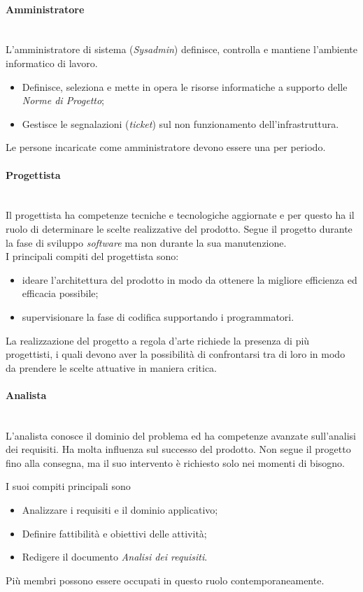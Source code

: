 \documentclass[10pt, letterpaper]{article}
\newcommand{\trisubsection}[1]{\paragraph{#1}\mbox{}\\}
\begin{document}
\label{sec:Amministratore}
\trisubsection{Amministratore}
L'amministratore di sistema (\textit{Sysadmin}) definisce, controlla e mantiene l'ambiente informatico di lavoro.
\begin{itemize}
    \item Definisce, seleziona e mette in opera le risorse informatiche a supporto delle \textit{Norme di Progetto};
    \item Gestisce le segnalazioni (\textit{ticket}) sul non funzionamento dell'infrastruttura.
\end{itemize}
Le persone incaricate come amministratore devono essere una per periodo.

\label{sec:Progettista}
\trisubsection{Progettista}
Il progettista ha competenze tecniche e tecnologiche aggiornate e per questo ha il ruolo di determinare le scelte realizzative del prodotto. Segue il progetto durante la fase di sviluppo \textit{software} ma non durante la sua manutenzione. \\

I principali compiti del progettista sono:
\begin{itemize}
    \item ideare l'architettura del prodotto in modo da ottenere la migliore efficienza ed efficacia possibile;
    \item supervisionare la fase di codifica supportando i programmatori.
\end{itemize}
La realizzazione del progetto a regola d'arte richiede la presenza di più progettisti, i quali devono aver la possibilità di confrontarsi tra di loro in modo da prendere le scelte attuative in maniera critica.

\label{sec:Analista}
\trisubsection{Analista}
L'analista conosce il dominio del problema ed ha competenze avanzate sull'analisi dei requisiti. Ha molta influenza sul successo del prodotto. Non segue il progetto fino alla consegna, ma il suo intervento è richiesto solo nei momenti di bisogno.

I suoi compiti principali sono
\begin{itemize}
    \item Analizzare i requisiti e il dominio applicativo;
    \item Definire fattibilità e obiettivi delle attività;
    \item Redigere il documento \textit{Analisi dei requisiti}.
\end{itemize}
Più membri possono essere occupati in questo ruolo contemporaneamente.
\end{document}
